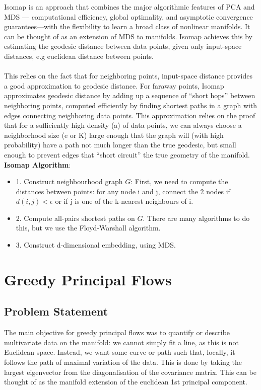 \documentclass[12pt]{report}
\begin{document}
Isomap is an approach that combines the major algorithmic features of PCA and MDS — computational efficiency, global optimality, and asymptotic convergence guarantees—with the flexibility to learn a broad class of nonlinear manifolds. It can be thought of as an extension of MDS to manifolds. Isomap achieves this by estimating the geodesic distance between data points, given only input-space distances, e.g euclidean distance between points.\\
\\
This relies on the fact that for neighboring points, input-space distance provides a good approximation to geodesic distance. For faraway points, Isomap approximates geodesic distance by adding up a sequence of “short hops” between neighboring points, computed efficiently by finding shortest paths in a graph with edges connecting neighboring data points.  This approximation relies on the proof that for a sufficiently high density (a) of data points, we can always choose a neighborhood size (e or K) large enough that the graph will (with high probability) have a path not much longer than the true geodesic, but small enough to prevent edges that “short circuit” the true geometry of the manifold.\\
\textbf{Isomap Algorithm}:
\begin{itemize}
    \item 1. Construct neighbourhood graph $G$: First, we need to compute the distances between points: for any node i and j, connect the 2 nodes if $d(i,j) < \epsilon$ or if j is one of the k-nearest neighbours of i.
    \item 2. Compute all-pairs shortest paths on $G$. There are many algorithms to do this, but we use the Floyd-Warshall algorithm.
    \item 3. Construct d-dimensional embedding, using MDS.
\end{itemize}

\chapter*{Greedy Principal Flows}

\section{Problem Statement}

The main objective for greedy principal flows was to quantify or describe multivariate data on the manifold: we cannot simply fit a line, as this is not Euclidean space. Instead, we want some curve or path such that, locally, it follows the path of maximal variation of the data. This is done by taking the largest eigenvector from the diagonalisation of the covariance matrix. This can be thought of as the manifold extension of the euclidean 1st principal component.
\end{document}
